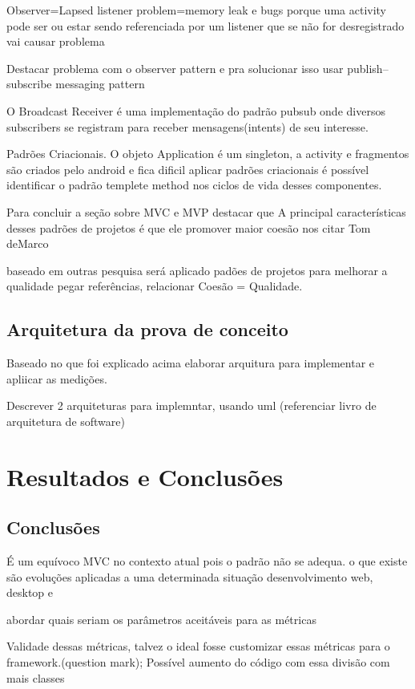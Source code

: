 Observer=Lapsed listener problem=memory leak e bugs porque uma activity pode ser
ou estar sendo referenciada por um listener que se não for desregistrado vai
causar problema

Destacar problema com o observer pattern e pra solucionar isso
usar publish–subscribe messaging pattern

O Broadcast Receiver é uma implementação do padrão pubsub onde diversos
subscribers se registram para receber mensagens(intents) de seu interesse.


Padrões Criacionais. O objeto Application é um singleton, a activity e
fragmentos são criados pelo android e fica dificil aplicar padrões criacionais é
possível identificar o padrão templete method nos ciclos de vida desses
componentes.



 Para concluir a seção sobre MVC e MVP destacar que A principal características
 desses padrões de projetos é que ele promover maior coesão nos citar Tom deMarco 

baseado em outras pesquisa será aplicado padões de projetos  para melhorar a
 qualidade pegar referências,  relacionar Coesão = Qualidade.

\section{Arquitetura da prova de conceito}

Baseado no que foi explicado acima elaborar arquitura para implementar e
apliicar as medições.

Descrever 2 arquiteturas para implemntar, usando uml (referenciar livro de
arquitetura de software)
\fi
\chapter{Resultados e Conclusões}

\section{Conclusões}

É um equívoco MVC no contexto atual pois o padrão não se adequa. o que existe
são evoluções aplicadas a uma determinada situação desenvolvimento web, desktop
e  

abordar quais seriam os parâmetros aceitáveis para as métricas

Validade dessas métricas, talvez o ideal fosse customizar essas métricas para o
framework.(question mark);
Possível aumento do código com essa divisão com mais classes

